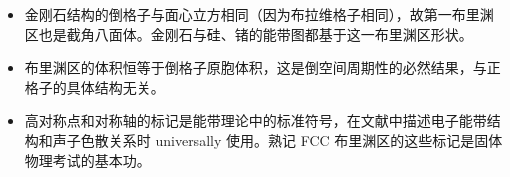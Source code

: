\begin{insightbox}[物理图像]
\begin{itemize}
    \item 金刚石结构的倒格子与面心立方相同（因为布拉维格子相同），故第一布里渊区也是截角八面体。金刚石与硅、锗的能带图都基于这一布里渊区形状。
    \item 布里渊区的体积恒等于倒格子原胞体积，这是倒空间周期性的必然结果，与正格子的具体结构无关。
    \item 高对称点和对称轴的标记是能带理论中的标准符号，在文献中描述电子能带结构和声子色散关系时 universally 使用。熟记 FCC 布里渊区的这些标记是固体物理考试的基本功。
\end{itemize}
\end{insightbox}
